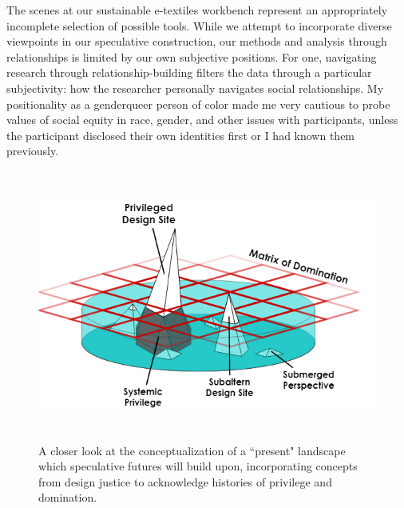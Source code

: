 The scenes at our sustainable e-textiles workbench represent an appropriately incomplete selection of possible tools. While we attempt to incorporate diverse viewpoints in our speculative construction, our methods and analysis through relationships is limited by our own subjective positions.
For one, navigating research through relationship-building filters the data through a particular subjectivity: how the researcher personally navigates social relationships. My positionality as a genderqueer person of color made me very cautious to probe values of social equity in race, gender, and other issues with participants, unless the participant disclosed their own identities first or I had known them previously.

\begin{figure}[ht]
  \centering
  \includegraphics[height=3.5in]{figs/EST_Matrix of Dom_Submerged Perspectives.png}
  \caption[An illustration of the ``present'' point of the futures cone incorporating design justice concepts.]{A closer look at the conceptualization of a ``present" landscape which speculative futures will build upon, incorporating concepts from design justice to acknowledge histories of privilege and domination.}
  \label{fig:matrix-of-domination}
\end{figure}

